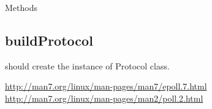 \documentclass{article}
\begin{document}
    Methods

    \subsection{buildProtocol} should create the instance of Protocol class.

  \begin{thebibliography}{2}
      \url{http://man7.org/linux/man-pages/man7/epoll.7.html}%
      \url{http://man7.org/linux/man-pages/man2/poll.2.html}%
  \end{thebibliography}
\end{document}
